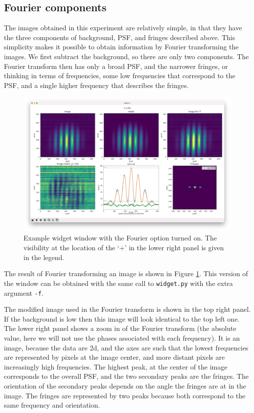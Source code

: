 \documentclass[11pt]{article}
\begin{document}
\subsection{Fourier components}\label{sec:fourier}

The images obtained in this experiment are relatively simple, in that they have the three components of background, PSF, and fringes described above. This simplicity makes it possible to obtain information by Fourier transforming the images. We first subtract the background, so there are only two components. The Fourier transform then has only a broad PSF, and the narrower fringes, or thinking in terms of frequencies, some low frequencies that correspond to the PSF, and a single higher frequency that describes the fringes.

\begin{figure}[h]
    \centering
   \includegraphics[width=1\textwidth]{widget-fourier.png}
    \caption{Example widget window with the Fourier option turned on. The visibility at the location of the `+' in the lower right panel is given in the legend.}
    \label{fig:widget-f}
\end{figure}

The result of Fourier transforming an image is shown in Figure \ref{fig:widget-f}. This version of the window can be obtained with the same call to \texttt{widget.py} with the extra argument \texttt{-f}.

The modified image used in the Fourier transform is shown in the top right panel. If the background is low then this image will look identical to the top left one. The lower right panel shows a zoom in of the Fourier transform (the absolute value, here we will not use the phases associated with each frequency). It is an image, because the data are 2d, and the axes are such that the lowest frequencies are represented by pixels at the image center, and more distant pixels are increasingly high frequencies. The highest peak, at the center of the image corresponds to the overall PSF, and the two secondary peaks are the fringes. The orientation of the secondary peaks depends on the angle the fringes are at in the image. The fringes are represented by two peaks because both correspond to the same frequency and orientation.
\end{document}
